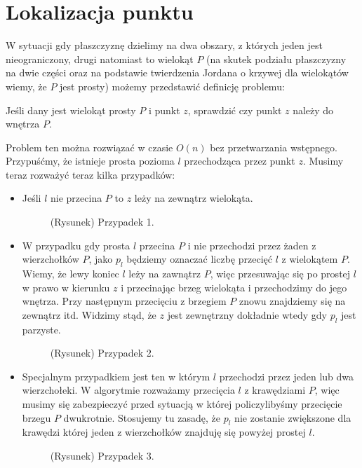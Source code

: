 \chapter{Lokalizacja punktu}
W sytuacji gdy płaszczyznę dzielimy na dwa obszary, z których jeden
jest nieograniczony, drugi natomiast to wielokąt $P$ (na skutek
podziału płaszczyzny na dwie części oraz na podstawie twierdzenia
Jordana o krzywej dla wielokątów wiemy, że $P$ jest prosty) możemy
przedstawić definicję problemu:

\begin{problem}
  Jeśli dany jest wielokąt prosty $P$ i punkt $z$, sprawdzić czy punkt $z$
  należy do wnętrza $P$.
\end{problem}

Problem ten można rozwiązać w czasie $O(n)$ bez przetwarzania
wstępnego. Przypuśćmy, że istnieje prosta pozioma $l$ przechodząca
przez punkt $z$. Musimy teraz rozważyć teraz kilka przypadków:

\begin{itemize}
\item Jeśli $l$ nie przecina $P$ to $z$ leży na zewnątrz wielokąta.
  \begin{figure}[htp]
    \centering
    \caption{(Rysunek) Przypadek 1.}
  \end{figure}
\item W przypadku gdy prosta $l$ przecina $P$ i nie przechodzi przez
  żaden z wierzchołków $P$, jako $p_l$ będziemy oznaczać liczbę
  przecięć $l$ z wielokątem $P$. Wiemy, że lewy koniec $l$ leży na
  zawnątrz $P$, więc przesuwając się po prostej $l$ w prawo w kierunku
  $z$ i przecinając brzeg wielokąta i przechodzimy do jego
  wnętrza. Przy następnym przecięciu z brzegiem $P$ znowu znajdziemy
  się na zewnątrz itd. Widzimy stąd, że $z$ jest zewnętrzny dokładnie
  wtedy gdy $p_l$ jest parzyste.
  \begin{figure}[htp]
    \centering
    \caption{(Rysunek) Przypadek 2.}
  \end{figure}
\item Specjalnym przypadkiem jest ten w którym $l$ przechodzi przez
  jeden lub dwa wierzchołeki. W algorytmie rozważamy przecięcia $l$ z
  krawędziami $P$, więc musimy się zabezpieczyć przed sytuacją w
  której policzylibyśmy przecięcie brzegu $P$ dwukrotnie. Stosujemy tu
  zasadę, że $p_l$ nie zostanie zwiększone dla krawędzi której jeden z
  wierzchołków znajduję się powyżej prostej $l$.
  \begin{figure}[htp]
    \centering
    \caption{(Rysunek) Przypadek 3.}
  \end{figure}
\end{itemize}


